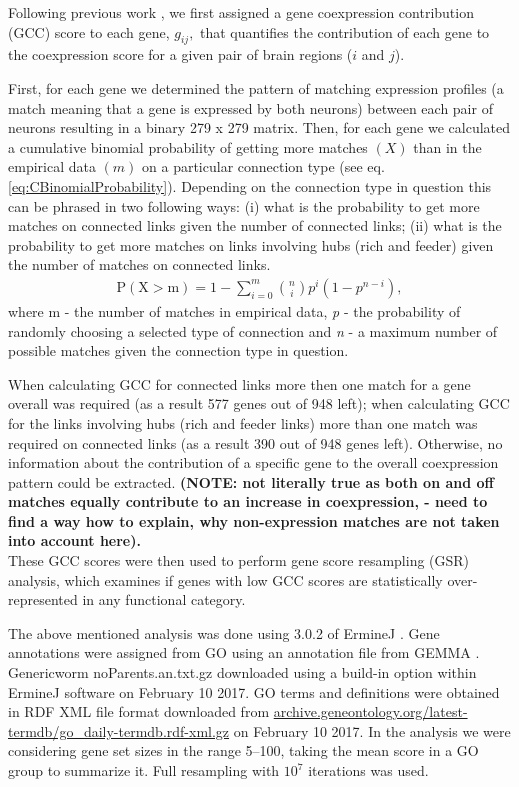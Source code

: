 \documentclass[10pt,letterpaper]{article}
\begin{document}
Following previous work \cite{Fulcher:2016ck}, we first assigned a gene coexpression contribution (GCC) score to each gene, $g_{ij},$ that quantifies the contribution of each gene to the coexpression score for a given pair of brain regions ($i$ and $j$).

First, for each gene we determined the pattern of matching expression profiles (a match meaning that a gene is expressed by both neurons) between each pair of neurons resulting in a binary 279 x 279 matrix.
Then, for each gene we calculated a cumulative binomial probability of getting more matches $(X)$ than in the empirical data $(m)$ on a particular connection type (see eq. \ref{eq:CBinomialProbability}).
Depending on the connection type in question this can be phrased in two following ways: (i) what is the probability to get more matches on connected links given the number of connected links; (ii) what is the probability to get more matches on links involving hubs (rich and feeder) given the number of matches on connected links.
\begin{eqnarray}
	\label{eq:CBinomialProbability}
     \mathrm{P(X>m)} = 1 - \sum_{\textit{i}=0}^{m}\binom{n}{i} p^{\textit{i}}(1-p^{n-\textit{i}}),
\end{eqnarray}
where m - the number of matches in empirical data, \textit{p} - the probability of randomly choosing a selected type of connection and \textit{n} - a maximum number of possible matches given the connection type in question.


When calculating GCC for connected links more then one match for a gene overall was required (as a result 577 genes out of 948 left); when calculating GCC for the links involving hubs (rich and feeder links) more than one match was required on connected links (as a result 390 out of 948 genes left).
Otherwise, no information about the contribution of a specific gene to the overall coexpression pattern could be extracted.
\textbf{(NOTE: not literally true as both on and off matches equally contribute to an increase in coexpression, - need to find a way how to explain, why non-expression matches are not taken into account here).}\\
These GCC scores were then used to perform gene score resampling (GSR) analysis, which examines if genes with low GCC scores are statistically over-represented in any functional category.

The above mentioned analysis was done using 3.0.2 of ErmineJ \cite{Gillis2010}.
Gene annotations were assigned from GO \cite{Ashburner2000} using an annotation file from GEMMA \cite{Zoubarev2012}.
Generic\textunderscore worm \textunderscore noParents.an.txt.gz downloaded using a build-in option within ErmineJ software on February 10 2017.
GO terms and definitions were obtained in RDF XML file format downloaded from \url{archive.geneontology.org/latest-termdb/go_daily-termdb.rdf-xml.gz} on February 10 2017.
In the analysis we were considering gene set sizes in the range 5–100, taking the mean score in a GO group to summarize it.
Full resampling with $10^{7}$ iterations was used.
\end{document}
